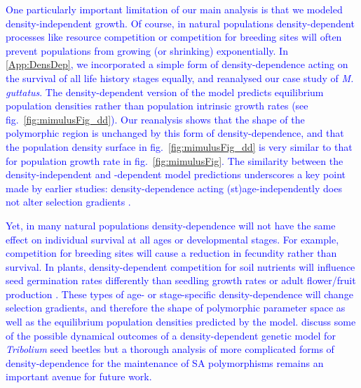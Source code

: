 \documentclass[11pt]{article}
\begin{document}
\textcolor{blue}{One particularly important limitation of our main analysis is that we modeled density-independent growth. Of course, in natural populations density-dependent processes like resource competition or competition for breeding sites will often prevent populations from growing (or shrinking) exponentially. In \ref{App:DensDep}, we incorporated a simple form of density-dependence acting on the survival of all life history stages equally, and reanalysed our case study of \textit{M. guttatus}. The density-dependent version of the model predicts equilibrium population densities rather than population intrinsic growth rates (see fig.~\ref{fig:mimulusFig_dd}). Our reanalysis shows that the shape of the polymorphic region is unchanged by this form of density-dependence, and that the population density surface in fig.~\ref{fig:mimulusFig_dd} is very similar to that for population growth rate in fig.~\ref{fig:mimulusFig}. The similarity between the density-independent and -dependent model predictions underscores a key point made by earlier studies: density-dependence acting (st)age-independently does not alter selection gradients \citep{mylius1995evolutionarily, caswell2017senescence}.}

\textcolor{blue}{Yet, in many natural populations density-dependence will not have the same effect on individual survival at all ages or developmental stages. For example, competition for breeding sites will cause a reduction in fecundity rather than survival. In plants, density-dependent competition for soil nutrients will influence seed germination rates differently than seedling growth rates or adult flower/fruit production \citep{AntonovicsLevin1980}. These types of age- or stage-specific density-dependence will change selection gradients, and therefore the shape of polymorphic parameter space as well as the equilibrium population densities predicted by the model. \citet{de2020matrix} discuss some of the possible dynamical outcomes of a density-dependent genetic model for \textit{Tribolium} seed beetles but a thorough analysis of more complicated forms of density-dependence for the maintenance of SA polymorphisms remains an important avenue for future work.}
\end{document}
